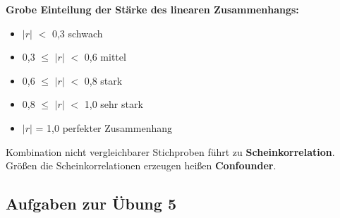 \textbf{Grobe Einteilung der Stärke des linearen Zusammenhangs:}
\begin{itemize}
	\item $|r|$ $<$ 0,3 schwach
	\item 0,3 $\leq$ $|r|$ $<$ 0,6 mittel
	\item 0,6 $\leq$ $|r|$ $<$ 0,8 stark
	\item 0,8 $\leq$ $|r|$ $<$ 1,0 sehr stark
	\item $|r|$ = 1,0 perfekter Zusammenhang
\end{itemize}

Kombination nicht vergleichbarer Stichproben führt zu \textbf{Scheinkorrelation}. Größen die Scheinkorrelationen erzeugen heißen \textbf{Confounder}.

\subsection{Aufgaben zur Übung 5}